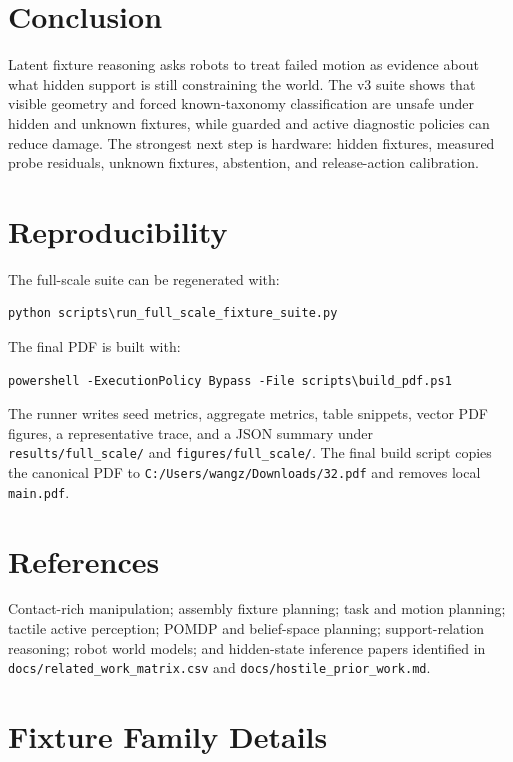 \documentclass{article}
\begin{document}
\section{Conclusion}

Latent fixture reasoning asks robots to treat failed motion as evidence about
what hidden support is still constraining the world. The v3 suite shows that
visible geometry and forced known-taxonomy classification are unsafe under
hidden and unknown fixtures, while guarded and active diagnostic policies can
reduce damage. The strongest next step is hardware: hidden fixtures, measured
probe residuals, unknown fixtures, abstention, and release-action calibration.

\section{Reproducibility}

The full-scale suite can be regenerated with:

\begin{verbatim}
python scripts\run_full_scale_fixture_suite.py
\end{verbatim}

The final PDF is built with:

\begin{verbatim}
powershell -ExecutionPolicy Bypass -File scripts\build_pdf.ps1
\end{verbatim}

The runner writes seed metrics, aggregate metrics, table snippets, vector PDF
figures, a representative trace, and a JSON summary under
\texttt{results/full\_scale/} and \texttt{figures/full\_scale/}. The final
build script copies the canonical PDF to
\texttt{C:/Users/wangz/Downloads/32.pdf} and removes local \texttt{main.pdf}.

\section*{References}
\small
Contact-rich manipulation; assembly fixture planning; task and motion
planning; tactile active perception; POMDP and belief-space planning;
support-relation reasoning; robot world models; and hidden-state inference
papers identified in \texttt{docs/related\_work\_matrix.csv} and
\texttt{docs/hostile\_prior\_work.md}.

\appendix
\renewcommand{\thesection}{\arabic{section}}

\section{Fixture Family Details}
\end{document}
